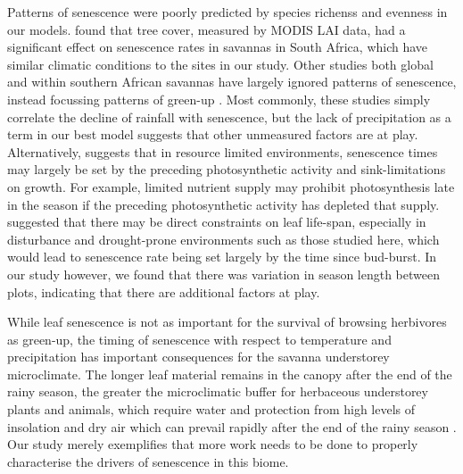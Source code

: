 \documentclass[11pt,a4paper]{article}
\begin{document}
Patterns of senescence were poorly predicted by species richenss and evenness in
our models. \citet{Cho2017} found that tree cover, measured by MODIS LAI data,
had a significant effect on senescence rates in savannas in South Africa, which
have similar climatic conditions to the sites in our study. Other studies both
global and within southern African savannas have largely ignored patterns of
senescence, instead focussing patterns of green-up \citep{Gallinat2015}. Most
commonly, these studies simply correlate the decline of rainfall with
senescence, but the lack of precipitation as a term in our best model suggests
that other unmeasured factors are at play. Alternatively, \citet{Zani2020}
suggests that in resource limited environments, senescence times may largely be
set by the preceding photosynthetic activity and sink-limitations on growth. For
example, limited nutrient supply may prohibit photosynthesis late in the season
if the preceding photosynthetic activity has depleted that supply.
\citet{Reich1992} suggested that there may be direct constraints on leaf
life-span, especially in disturbance and drought-prone environments such as
those studied here, which would lead to senescence rate being set largely by the
time since bud-burst. In our study however, we found that there was variation in
season length between plots, indicating that there are additional factors at
play.

While leaf senescence is not as important for the survival of browsing
herbivores as green-up, the timing of senescence with respect to temperature and
precipitation has important consequences for the savanna understorey
microclimate. The longer leaf material remains in the canopy after the end of
the rainy season, the greater the microclimatic buffer for herbaceous
understorey plants and animals, which require water and protection from high
levels of insolation and dry air which can prevail rapidly after the end of the
rainy season \citep{}. Our study merely exemplifies that more work needs to be
done to properly characterise the drivers of senescence in this biome.
\end{document}
